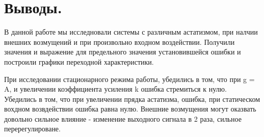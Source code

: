 \documentclass[a4paper, 11pt]{article}
\begin{document}
\section*{Выводы.}
В данной работе мы исследновали системы с различным астатизмом, при налчии внешних возмущений и при произвольно входном воздействии. Получили значения и выражение для предельного значения установившейся ошибки и построили графики переходной характеристики. \par
При исследовании стационарного режима работы, убедились в том, что при g = A, и увеличении коэффициента усиления k ошибка стремиться к нулю. 
Убедились в том, что при увеличении прядка астатизма, ошибка, при статическом вохдном возвдействии ошибка равна нулю.
Внешние возмущения могут оказвать довольно сильное влияние - изменение выходного сигнала в 2 раза, сильное перерегулироване.
\end{document}
